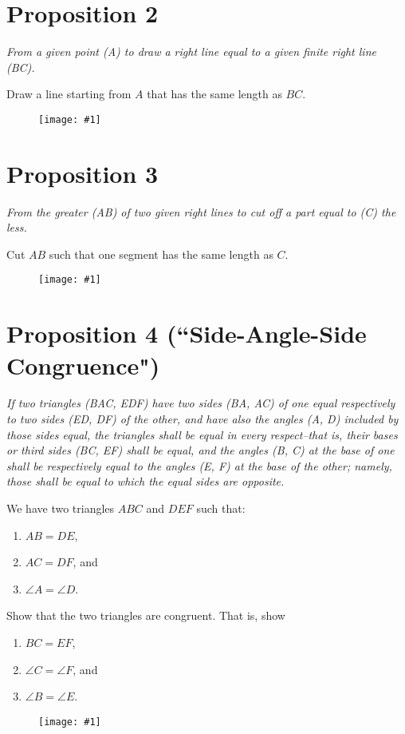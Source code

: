 \documentclass[openany]{book}
\newcommand{\diagram}[1]{
    \vspace*{\fill}
    \begin{figure}[H]
        \centering
        \texttt{[image: \#1]}
    \end{figure}
    \vspace*{\fill}
}
\newenvironment{proposition}
    {\begin{center}\em}
    {\end{center}}
\begin{document}
    \clearpage
    \section{Proposition 2}
    \begin{proposition}
    From a given point (A) to draw a right line equal to a given finite right line (BC).
    \end{proposition}
    Draw a line starting from $A$ that has the same length as $BC$.
    \diagram{prop2.pdf}


    \clearpage
    \section{Proposition 3}
    \begin{proposition}
    From the greater (AB) of two given right lines to cut
    off a part equal to (C) the less.
    \end{proposition}
    Cut $AB$ such that one segment has the same length as $C$.
    \diagram{prop3.pdf}


    \clearpage
    \section{Proposition 4 (``Side-Angle-Side Congruence")}
    \begin{proposition}
    If two triangles (BAC, EDF) have two sides (BA, AC) of one equal respectively
    to two sides (ED, DF) of the other, and have also the angles
    (A, D) included by those sides equal, the triangles shall be equal
    in every respect--that is, their bases or third sides (BC, EF) shall be equal,
    and the angles (B, C) at the base of one shall be respectively equal
    to the angles (E, F) at the base of the other; namely, those shall
    be equal to which the equal sides are opposite.
    \end{proposition}
    We have two triangles $ABC$ and $DEF$ such that:
    \begin{enumerate}
        \item $AB = DE$,
        \item $AC = DF$, and
        \item $\angle{A} = \angle{D}$.
    \end{enumerate}
    Show that the two triangles are congruent. That is, show
    \begin{enumerate}
        \item $BC = EF$,
        \item $\angle{C} = \angle{F}$, and
        \item $\angle{B} = \angle{E}$.
    \end{enumerate}
    \diagram{prop4.pdf}
\end{document}
